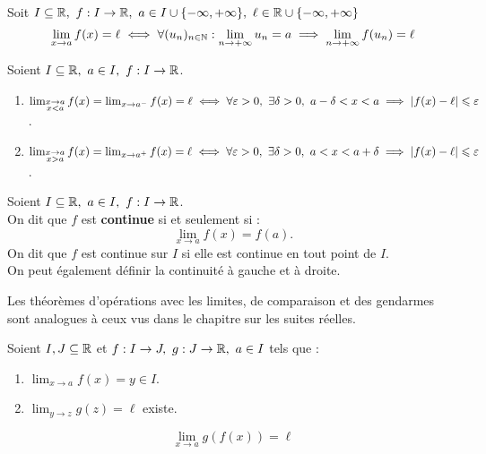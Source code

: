 \begin{theorem}
	Soit $I \subseteq \mathbb{R},\ f : I \to \mathbb{R},\ a \in I \cup \{-\infty, +\infty\},\ \ell \in \mathbb{R} \cup \{-\infty, +\infty\}$
	\[ \lim_{x \to a} f(x) = \ell \iff \forall (u_n)_{n \in \mathbb{N}} : \lim_{n \to +\infty} u_n = a \implies \lim_{n \to +\infty} f(u_n) = \ell \]
\end{theorem}

\begin{definition}
    Soient $I \subseteq \mathbb{R},\ a \in I,\ f : I \to \mathbb{R} $.
    \begin{enumerate}
        \item $ \lim_{\substack{x \to a \\ x < a}} f(x) = \lim_{x \to a^-} f(x) = \ell \iff \forall \varepsilon > 0,\ \exists \delta > 0,\ a - \delta < x < a \implies \abs{f(x) - \ell} \leq \varepsilon $.
        \item $\lim_{\substack{x \to a \\ x > a}} f(x) = \lim_{x \to a^+} f(x) = \ell \iff \forall \varepsilon > 0,\ \exists \delta > 0,\ a < x < a + \delta \implies \abs{f(x) - \ell} \leq \varepsilon$.
    \end{enumerate}
\end{definition}

\begin{definition}[Continuité]
	Soient $I \subseteq \mathbb{R},\ a \in I,\ f : I \to \mathbb{R}$.
        \\ 
        On dit que $f$ est \textbf{continue} si et seulement si :
        \[\lim_{x \to a} f(x) = f(a).\] 
	On dit que $f$ est continue sur $I$ si elle est continue en tout point de $I$.\\
	On peut également définir la continuité à gauche et à droite.
\end{definition}

\begin{remark}
	Les théorèmes d'opérations avec les limites, de comparaison et des gendarmes sont analogues à ceux vus  dans le chapitre sur les suites réelles.
\end{remark}

\begin{theorem}
	Soient $I, J \subseteq \mathbb{R}$ et $f : I \to J,\ g : J \to \mathbb{R},\ a \in I$ tels que :
	\begin{enumerate}
		\item $\lim_{x \to a} f(x) = y \in I$.
		\item $\lim_{y \to z} g(z) = \ell$ existe.
	\end{enumerate}
	\[ \lim_{x \to a} g(f(x)) = \ell \]
\end{theorem}


